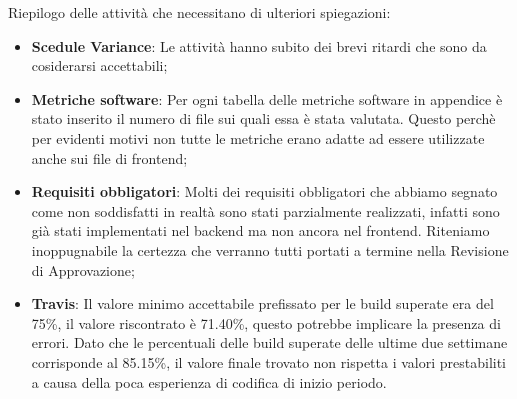 
Riepilogo delle attività che necessitano di ulteriori spiegazioni:
\begin{itemize}
    \item \textbf{Scedule Variance}: Le attività hanno subito dei brevi ritardi che sono da cosiderarsi accettabili;
    \item \textbf{Metriche software}: Per ogni tabella delle metriche software in appendice è stato inserito 
    il numero di file sui quali essa è stata valutata.
    Questo perchè per evidenti motivi non tutte le metriche erano adatte ad essere utilizzate anche 
    sui file di frontend;
    \item \textbf{Requisiti obbligatori}: Molti dei requisiti obbligatori che abbiamo segnato come non 
    soddisfatti in realtà sono stati parzialmente realizzati, infatti sono già stati implementati nel
    backend ma non ancora nel frontend. Riteniamo inoppugnabile la certezza che verranno tutti portati 
    a termine nella Revisione di Approvazione;
    \item \textbf{Travis}: Il valore minimo accettabile prefissato per le build superate era del 75\%, il valore riscontrato
    è 71.40\%, questo potrebbe implicare la presenza di errori. Dato che le percentuali delle
    build superate delle ultime due settimane corrisponde al 85.15\%, il valore finale
    trovato non rispetta i valori prestabiliti a causa della poca esperienza di codifica di inizio periodo.
\end{itemize}

